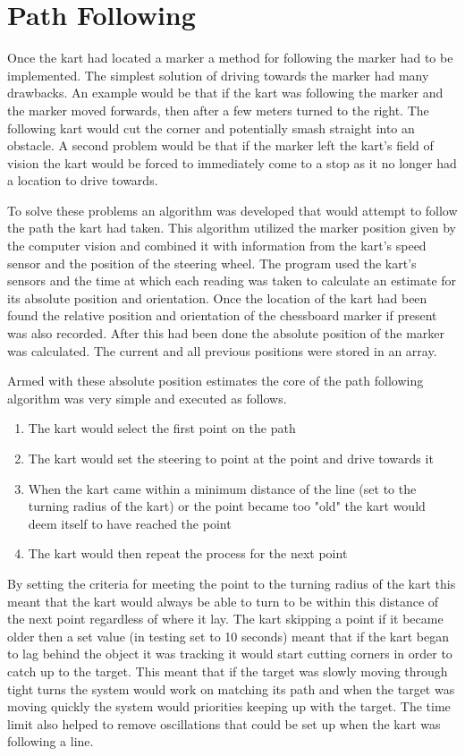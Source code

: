 \section{Path Following}
Once the kart had located a marker a method for following the marker had to be implemented. The simplest solution of driving towards the marker had many drawbacks. An example would be that if the kart was following the marker and the marker moved forwards, then after a few meters turned to the right. The following kart would cut the corner and potentially smash straight into an obstacle. A second problem would be that if the marker left the kart’s field of vision the kart would be forced to immediately come to a stop as it no longer had a location to drive towards.

To solve these problems an algorithm was developed that would attempt to follow the path the kart had taken. This algorithm utilized the marker position given by the computer vision and combined it with information from the kart’s speed sensor and the position of the steering wheel. The program used the kart’s sensors and the time at which each reading was taken to calculate an estimate for its absolute position and orientation. Once the location of the kart had been found the relative position and orientation of the chessboard marker if present was also recorded. After this had been done the absolute position of the marker was calculated. The current and all previous positions were stored in an array.

Armed with these absolute position estimates the core of the path following algorithm was very simple and executed as follows. 
\begin{enumerate}
\item The kart would select the first point on the path
\item The kart would set the steering to point at the point and drive towards it
\item When the kart came within a minimum distance of the line (set to the turning radius of the kart)  or the point became too "old" the kart would deem itself to have reached the point
\item The kart would then repeat the process for the next point
\end{enumerate}

By setting the criteria for meeting the point to the turning radius of the kart this meant that the kart would always be able to turn to be within this distance  of the next point regardless of where it lay. The kart skipping a point if it became older then a set value (in testing set to 10 seconds) meant that if the kart began to lag behind the object it was tracking it would start cutting corners in order to catch up to the target. This meant that if the target was slowly moving through tight turns the system would work on matching its path and when the target was moving quickly the system would priorities keeping up with the target. The time limit also helped to remove oscillations that could be set up when the kart was following a line.


